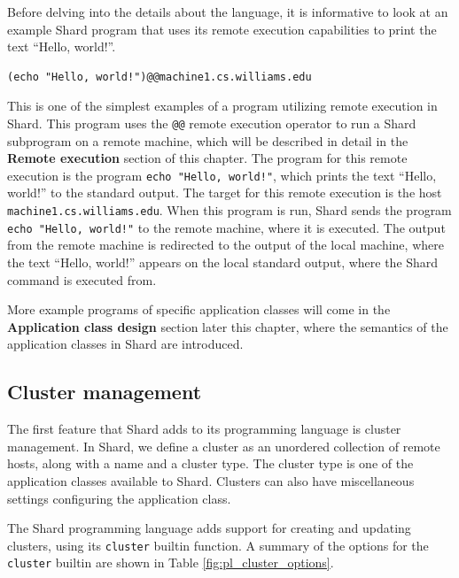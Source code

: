 \documentclass[twoside]{report}
\begin{document}
Before delving into the details about the language, it is informative to look at an example Shard program that uses its remote execution capabilities to print the text ``Hello, world!''.

\begin{minipage}[c]{\textwidth-15pt}
  \begin{lstlisting}[language=Shard]
(echo "Hello, world!")@@machine1.cs.williams.edu
\end{lstlisting}
  \smallskip
\end{minipage}

This is one of the simplest examples of a program utilizing remote execution in Shard.
This program uses the \texttt{@@} remote execution operator to run a Shard subprogram on a remote machine, which will be described in detail in the \textbf{Remote execution} section of this chapter.
The program for this remote execution is the program \texttt{echo "Hello, world!"}, which prints the text ``Hello, world!'' to the standard output.
The target for this remote execution is the host \texttt{machine1.cs.williams.edu}.
When this program is run, Shard sends the program \texttt{echo "Hello, world!"} to the remote machine, where it is executed.
The output from the remote machine is redirected to the output of the local machine, where the text ``Hello, world!'' appears on the local standard output, where the Shard command is executed from.

More example programs of specific application classes will come in the \textbf{Application class design} section later this chapter, where the semantics of the application classes in Shard are introduced.

\subsection{Cluster management}
The first feature that Shard adds to its programming language is cluster management.
In Shard, we define a cluster as an unordered collection of remote hosts, along with a name and a cluster type.
The cluster type is one of the application classes available to Shard.
Clusters can also have miscellaneous settings configuring the application class.

The Shard programming language adds support for creating and updating clusters, using its \texttt{cluster} builtin function.
A summary of the options for the \texttt{cluster} builtin are shown in Table \ref{fig:pl_cluster_options}.
\end{document}
